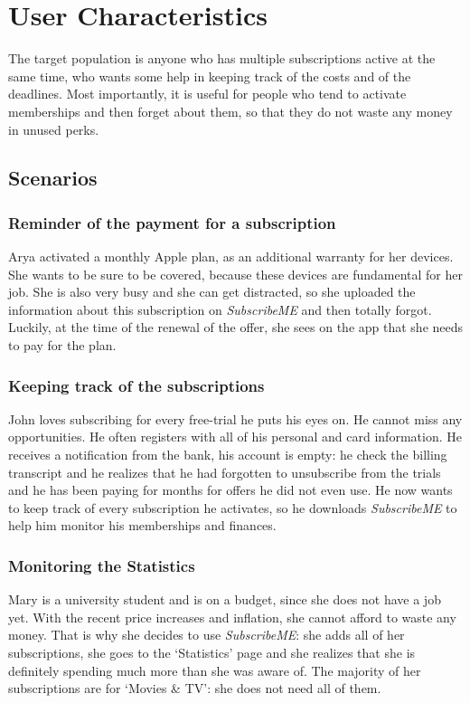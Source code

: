 \documentclass[11pt]{article}
\begin{document}
\newpage
\section{User Characteristics}\label{sec:char}
The target population is anyone who has multiple subscriptions active at the same time, who wants some help in keeping track of the costs and of the deadlines. Most importantly, it is useful for people who tend to activate memberships and then forget about them, so that they do not waste any money in unused perks.

\subsection{Scenarios}\label{sub:scenarios}
\subsubsection{Reminder of the payment for a subscription}
Arya activated a monthly Apple plan, as an additional warranty for her devices. She wants to be sure to be covered, because these devices are fundamental for her job. She is also very busy and she can get distracted, so she uploaded the information about this subscription on \textit{SubscribeME} and then totally forgot. Luckily, at the time of the renewal of the offer, she sees on the app that she needs to pay for the plan.

\subsubsection{Keeping track of the subscriptions}
John loves subscribing for every free-trial he puts his eyes on. He cannot miss any opportunities. He often registers with all of his personal and card information. He receives a notification from the bank, his account is empty: he check the billing transcript and he realizes that he had forgotten to unsubscribe from the trials and he has been paying for months for offers he did not even use. He now wants to keep track of every subscription he activates, so he downloads \textit{SubscribeME} to help him monitor his memberships and finances.

\subsubsection{Monitoring the Statistics}
Mary is a university student and is on a budget, since she does not have a job yet. With the recent price increases and inflation, she cannot afford to waste any money. That is why she decides to use \textit{SubscribeME}: she adds all of her subscriptions, she goes to the `Statistics' page and she realizes that she is definitely spending much more than she was aware of. The majority of her subscriptions are for `Movies \& TV': she does not need all of them.
\end{document}
